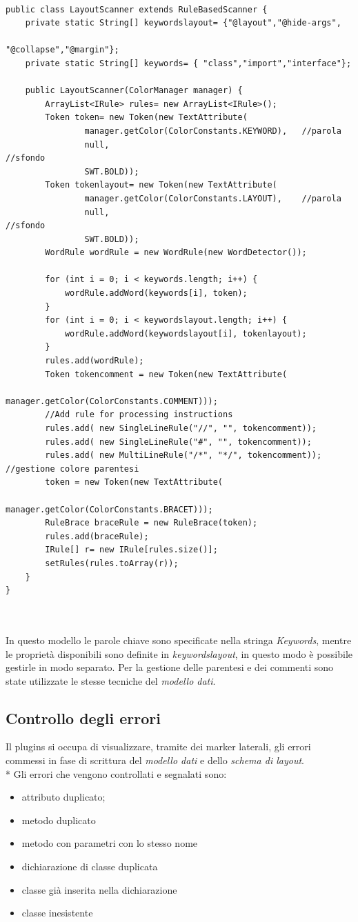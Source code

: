 \begin{lstlisting}[caption={LayoutScanner}, style={java}]

public class LayoutScanner extends RuleBasedScanner {
	private static String[] keywordslayout= {"@layout","@hide-args",
												"@collapse","@margin"};
	private static String[] keywords= { "class","import","interface"};
	
	public LayoutScanner(ColorManager manager) {
		ArrayList<IRule> rules= new ArrayList<IRule>();
		Token token= new Token(new TextAttribute(
				manager.getColor(ColorConstants.KEYWORD), 	//parola
				null, 																			//sfondo
				SWT.BOLD));
		Token tokenlayout= new Token(new TextAttribute(
				manager.getColor(ColorConstants.LAYOUT), 	//parola
				null, 																		//sfondo
				SWT.BOLD));
		WordRule wordRule = new WordRule(new WordDetector());

		for (int i = 0; i < keywords.length; i++) {
			wordRule.addWord(keywords[i], token);
		}
		for (int i = 0; i < keywordslayout.length; i++) {
			wordRule.addWord(keywordslayout[i], tokenlayout);
		}
		rules.add(wordRule);
		Token tokencomment = new Token(new TextAttribute(
								manager.getColor(ColorConstants.COMMENT)));
		//Add rule for processing instructions		
		rules.add( new SingleLineRule("//", "", tokencomment));
		rules.add( new SingleLineRule("#", "", tokencomment));
		rules.add( new MultiLineRule("/*", "*/", tokencomment));
//gestione colore parentesi
		token = new Token(new TextAttribute(
										manager.getColor(ColorConstants.BRACET)));
		RuleBrace braceRule = new RuleBrace(token);
		rules.add(braceRule);
		IRule[] r= new IRule[rules.size()];
		setRules(rules.toArray(r));
	}
}



\end{lstlisting}



In questo modello le parole chiave sono specificate nella
stringa \emph{Keywords}, mentre le proprietà disponibili sono definite in
\emph{keywordslayout}, in questo modo è possibile gestirle in modo separato.
Per la gestione delle parentesi e dei commenti sono state utilizzate le stesse
tecniche del \emph{modello dati}.

\subsection{Controllo degli errori} 
Il plugins si occupa di visualizzare, tramite dei marker laterali, gli errori 
commessi in fase di scrittura del \emph{modello dati} e dello \emph{schema di
layout}. \\*
Gli errori che vengono controllati e segnalati sono:
\begin{itemize}
  \item attributo duplicato;
  \item metodo duplicato
  \item metodo con parametri con lo stesso nome
  \item dichiarazione di classe duplicata
  \item classe già inserita nella dichiarazione
  \item classe inesistente
\end{itemize} 

